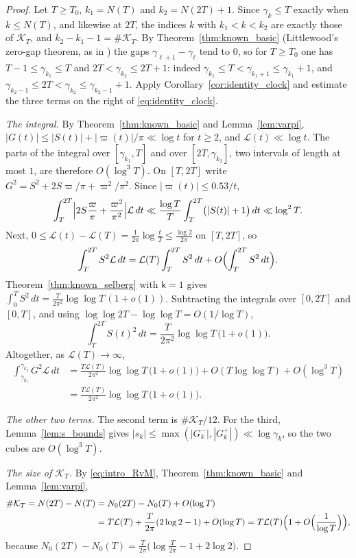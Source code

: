 \documentclass[11pt,a4paper]{article}
\makeatletter
\numberwithin{equation}{section}
\DeclareRobustCommand{\CGref}[1]{\ref{#1}}
\DeclareRobustCommand{\CGeqref}[1]{\eqref{#1}}
\DeclareRobustCommand{\CGcite}[2][]{\if\relax\detokenize{#1}\relax\cite{#2}\else\cite[#1]{#2}\fi}
\let\CG@origref\ref
\let\CG@origeqref\eqref
\newcommand{\CG@gettip}[1]{\@ifundefined{CGTip@#1}{#1}{\csname CGTip@#1\endcsname}}
\newcommand{\CG@getbib}[1]{\@ifundefined{CGBib@#1}{#1}{\csname CGBib@#1\endcsname}}
\DeclareRobustCommand{\CGref}[1]{\pdftooltip{\CG@origref{#1}}{\CG@gettip{#1}}}
\DeclareRobustCommand{\CGeqref}[1]{\pdftooltip{\CG@origeqref{#1}}{\CG@gettip{#1}}}
\DeclareRobustCommand{\CGcite}[2][]{\pdftooltip{\if\relax\detokenize{#1}\relax\cite{#2}\else\cite[#1]{#2}\fi}{\CG@getbib{#2}}}
\theoremstyle{definition}
\theoremstyle{remark}
\newcommand{\Nz}{N_0} %
\newcommand{\lL}{\mathcal L}
\newcommand{\Kc}{\mathcal K}
\makeatother
\begin{document}
\begin{proof}
Let $T\ge T_0$, $k_1=N(T)$ and $k_2=N(2T)+1$. Since $\gamma_k\le T$ exactly when $k\le N(T)$, and likewise at $2T$, the indices $k$ with $k_1<k<k_2$ are exactly those of $\Kc_T$, and $k_2-k_1-1=\#\Kc_T$. By Theorem~\CGref{thm:known_basic} (Littlewood's zero-gap theorem, as in \CGcite[Thm.~9.12]{Titchmarsh1986}) the gaps $\gamma_{\ell+1}-\gamma_\ell$ tend to $0$, so for $T\ge T_0$ one has $T-1\le\gamma_{k_1}\le T$ and $2T<\gamma_{k_2}\le2T+1$: indeed $\gamma_{k_1}\le T<\gamma_{k_1+1}\le\gamma_{k_1}+1$, and $\gamma_{k_2-1}\le2T<\gamma_{k_2}\le\gamma_{k_2-1}+1$. Apply Corollary~\CGref{cor:identity_clock} and estimate the three terms on the right of \CGeqref{eq:identity_clock}.

\emph{The integral.} By Theorem~\CGref{thm:known_basic} and Lemma~\CGref{lem:varpi}, $|G(t)|\le|S(t)|+|\varpi(t)|/\pi\ll\log t$ for $t\ge2$, and $\lL(t)\ll\log t$. The parts of the integral over $[\gamma_{k_1},T]$ and over $[2T,\gamma_{k_2}]$, two intervals of length at most $1$, are therefore $O(\log^3T)$. On $[T,2T]$ write $G^2=S^2+2S\varpi/\pi+\varpi^2/\pi^2$. Since $|\varpi(t)|\le0.53/t$,
\[
\int_T^{2T}\Bigl|2S\frac\varpi\pi+\frac{\varpi^2}{\pi^2}\Bigr|\lL\,dt\ll\frac{\log T}{T}\int_T^{2T}\bigl(|S(t)|+1\bigr)\,dt\ll\log^2T .
\]
Next, $0\le\lL(t)-\lL(T)=\frac1{2\pi}\log\frac tT\le\frac{\log2}{2\pi}$ on $[T,2T]$, so
\[
\int_T^{2T}S^2\lL\,dt=\lL(T)\int_T^{2T}S^2\,dt+O\Bigl(\int_T^{2T}S^2\,dt\Bigr).
\]
Theorem~\CGref{thm:known_selberg} with $\mathsf k=1$ gives $\int_0^TS^2\,dt=\frac{T}{2\pi^2}\log\log T\,(1+o(1))$. Subtracting the integrals over $[0,2T]$ and $[0,T]$, and using $\log\log2T-\log\log T=O(1/\log T)$,
\begin{equation}
\int_T^{2T}S(t)^2\,dt=\frac{T}{2\pi^2}\log\log T\,\bigl(1+o(1)\bigr).
\label{eq:selberg_dyadic}
\end{equation}
Altogether, as $\lL(T)\to\infty$,
\[
\begin{aligned}
\int_{\gamma_{k_1}}^{\gamma_{k_2}}G^2\lL\,dt&=\frac{T\lL(T)}{2\pi^2}\log\log T\,\bigl(1+o(1)\bigr)+O(T\log\log T)+O(\log^3T)\\
&=\frac{T\lL(T)}{2\pi^2}\log\log T\,\bigl(1+o(1)\bigr).
\end{aligned}
\]

\emph{The other two terms.} The second term is $\#\Kc_T/12$. For the third, Lemma~\CGref{lem:s_bounds} gives $|s_k|\le\max(|G_k^-|,|G_k^+|)\ll\log\gamma_k$, so the two cubes are $O(\log^3T)$.

\emph{The size of $\Kc_T$.} By \CGeqref{eq:intro_RvM}, Theorem~\CGref{thm:known_basic} and Lemma~\CGref{lem:varpi},
\[
\begin{aligned}
\#\Kc_T=N(2T)-N(T)&=\Nz(2T)-\Nz(T)+O(\log T)\\
&=T\lL(T)+\frac{T}{2\pi}(2\log2-1)+O(\log T)=T\lL(T)\Bigl(1+O\Bigl(\frac1{\log T}\Bigr)\Bigr),
\end{aligned}
\]
because $\Nz(2T)-\Nz(T)=\frac T{2\pi}\bigl(\log\frac T{2\pi}-1+2\log2\bigr)$.


\end{proof}
\end{document}
